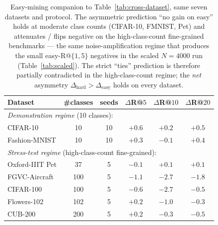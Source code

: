 \documentclass{article}
\begin{document}
\begin{table}[!htbp]
\centering
\small
\caption{Easy-mining companion to Table~\ref{tab:cross-dataset}, same
seven datasets and protocol. The asymmetric prediction ``no gain on
easy'' holds at moderate class counts (CIFAR-10, FMNIST, Pet) and
attenuates / flips negative on the high-class-count fine-grained
benchmarks --- the same noise-amplification regime that produces the
small easy-R@$\{1,5\}$ negatives in the scaled $N{=}4000$ run
(Table~\ref{tab:scaled}). The strict ``ties'' prediction is therefore
partially contradicted in the high-class-count regime; the
\emph{net} asymmetry $\Delta_{\mathrm{hard}}>\Delta_{\mathrm{easy}}$
holds on every dataset.}
\label{tab:cross-dataset-easy}
\begin{tabular}{lccccc}
\toprule
Dataset & \#classes & seeds & $\Delta$R@$5$ & $\Delta$R@$10$ & $\Delta$R@$20$ \\
\midrule
\multicolumn{6}{l}{\emph{Demonstration regime} (10 classes):} \\
CIFAR-10        &  10 & 10 & $+0.6$ & $+0.2$ & $+0.5$ \\
Fashion-MNIST   &  10 & 10 & $+0.3$ & $-0.1$ & $+0.4$ \\
\midrule
\multicolumn{6}{l}{\emph{Stress-test regime} (high-class-count fine-grained):} \\
Oxford-IIIT Pet &  37 &  5 & $-0.1$ & $+0.1$ & $+0.1$ \\
FGVC-Aircraft   & 100 &  5 & $-1.1$ & $\mathbf{-2.7}$ & $-1.8$ \\
CIFAR-100       & 100 &  5 & $-0.6$ & $\mathbf{-2.7}$ & $-0.5$ \\
Flowers-102     & 102 &  5 & $+0.2$ & $-1.0$ & $-0.3$ \\
CUB-200         & 200 &  5 & $+0.2$ & $-0.3$ & $-0.5$ \\
\bottomrule
\end{tabular}
\end{table}
\end{document}
